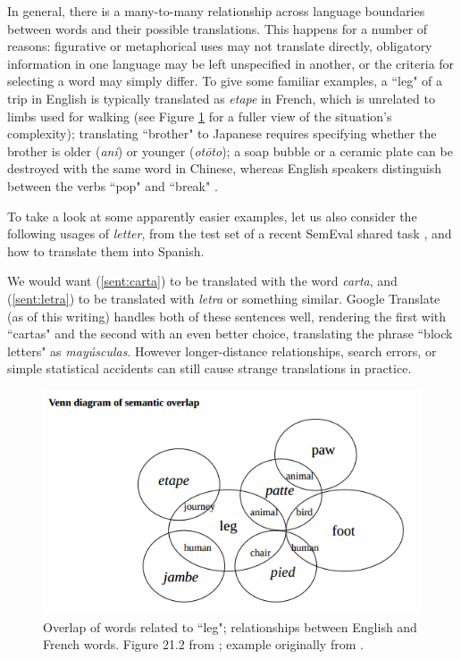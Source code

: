 In general, there is a many-to-many relationship across language boundaries
between words and their possible translations.
This happens for a number of reasons: figurative or metaphorical uses may not
translate directly,
obligatory information in one language may be left unspecified in another,
or the criteria for selecting a word may simply differ.
To give some familiar examples, a ``leg" of a trip in English is typically
translated as \emph{etape} in French, which is unrelated to limbs used for
walking (see Figure \ref{fig:leg} for a fuller view of the situation's
complexity);
translating ``brother" to Japanese requires specifying whether the brother is
older (\emph{ani}) or younger (\emph{ot\=oto});
a soap bubble or a ceramic plate can be destroyed with the same word in
Chinese, whereas English speakers distinguish between the verbs
``pop" and ``break" \cite{majid2007semantic}.

To take a look at some apparently easier examples, let us also consider the
following usages of \emph{letter}, from the test set of a recent SemEval shared
task \cite{task10}, and how to translate them into Spanish.

\label{sent:carta}
\label{sent:letra}

We would want (\ref{sent:carta}) to be translated with the word \emph{carta},
and (\ref{sent:letra}) to be translated with \emph{letra} or something similar.
Google Translate (as of this writing) handles both of these sentences well,
rendering the first with ``cartas" and the second with an even better choice,
translating the phrase ``block letters" as \emph{mayúsculas}.
However longer-distance relationships, search errors, or simple statistical
accidents can still cause strange translations in practice.

\begin{figure}
  \includegraphics[width=12cm]{hutchins-leg-etc.png}
  \caption{Overlap of words related to ``leg"; relationships between English
  and French words. Figure 21.2 from \protect\cite{slp1}; example originally
  from \protect\cite[Chapter 6]{hutchins1992introduction}.}
  \label{fig:leg}
\end{figure}

